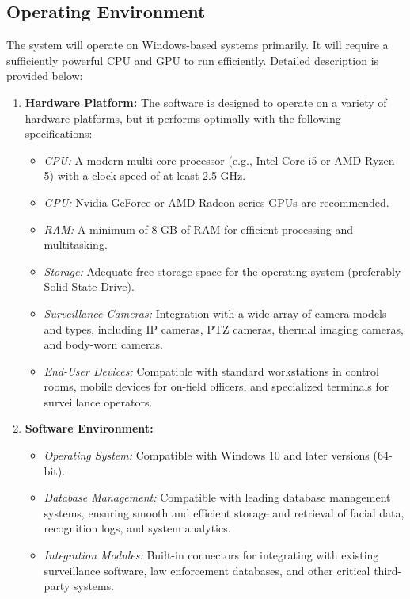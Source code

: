     \subsection{Operating Environment}
        The system will operate on Windows-based systems primarily. It will require a sufficiently powerful CPU and GPU to run efficiently. Detailed description is provided below:
        \begin{enumerate}
            \item \textbf{Hardware Platform:}
                The software is designed to operate on a variety of hardware platforms, but it performs optimally with the following specifications:
                \begin{itemize}
                    \item \textit{CPU:} A modern multi-core processor (e.g., Intel Core i5 or AMD Ryzen 5) with a clock speed of at least 2.5 GHz.
                    \item \textit{GPU:} Nvidia GeForce or AMD Radeon series GPUs are recommended.
                    \item \textit{RAM:} A minimum of 8 GB of RAM for efficient processing and multitasking.
                    \item \textit{Storage:} Adequate free storage space for the operating system (preferably Solid-State Drive).
                    \item \textit{Surveillance Cameras:} Integration with a wide array of camera models and types, including IP cameras, PTZ cameras, thermal imaging cameras, and body-worn cameras.
                    \item \textit{End-User Devices:} Compatible with standard workstations in control rooms, mobile devices for on-field officers, and specialized terminals for surveillance operators.
                \end{itemize}
            \item \textbf{Software Environment:}
                \begin{itemize}
                    \item \textit{Operating System:} Compatible with Windows 10 and later versions (64-bit).
                    \item \textit{Database Management:} Compatible with leading database management systems, ensuring smooth and efficient storage and retrieval of facial data, recognition logs, and system analytics.
                    \item \textit{Integration Modules:} Built-in connectors for integrating with existing surveillance software, law enforcement databases, and other critical third-party systems.                    

\end{itemize}
\end{enumerate}
